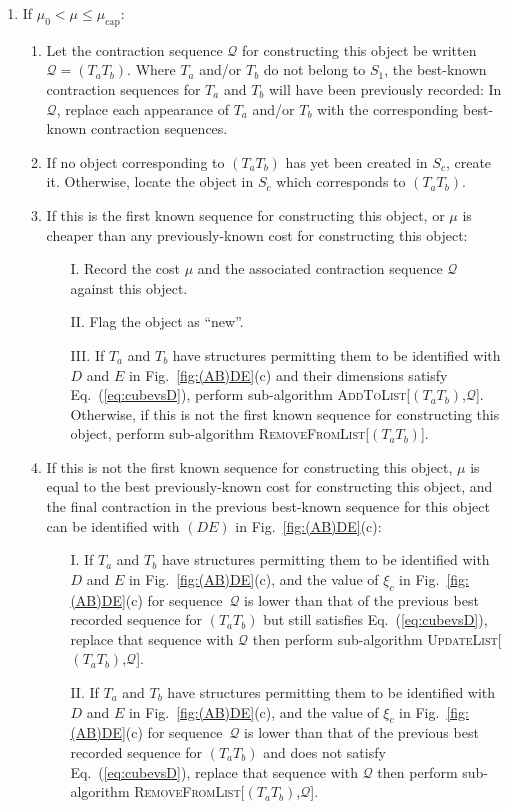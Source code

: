 \documentclass[aps,pre,reprint,superscriptaddress,amsfonts,amsmath,showpacs,nofootinbib,floatfix]{revtex4-1}
\newcommand{\mrm}[1]{\mathrm{#1}}
\newcommand{\mc}[1]{\mathcal{#1}}
\newcommand{\Eref}[1]{Eq.~(\ref{#1})}
\newcommand{\fref}[1]{Fig.~\ref{#1}}
\newcommand{\xc}{\xi_c}
\newcommand{\fuse}[2]{(#1#2)} %
\begin{document}
\begin{enumerate}
\begin{enumerate}
\begin{enumerate}
\item If $\mu_0<\mu\leq\mu_\mrm{cap}$: 
\begin{enumerate}
\item Let the contraction sequence $\mc{Q}$ for constructing this object be written $\mc{Q}=\fuse{T_a}{T_b}$. Where $T_a$ and/or $T_b$ do not belong to $S_1$, the best-known contraction sequences for $T_a$ and $T_b$ will have been previously recorded: In $\mc{Q}$, replace each appearance of $T_a$ and/or $T_b$ with the corresponding best-known contraction sequences.
\item If no object corresponding to $\fuse{T_a}{T_b}$ has yet been created in $S_c$, create it. Otherwise, locate the object in $S_c$ which corresponds to $\fuse{T_a}{T_b}$.
\item If this is the first known sequence for constructing this object, or $\mu$ is cheaper than any previously-known cost for constructing this object:
\begin{itemize}
\item[I.] Record the cost $\mu$ and the associated contraction sequence $\mc{Q}$ against this object.
\item[II.] Flag the object as ``new''. 
\item[III.] If $T_a$ and $T_b$ have structures permitting them to be identified with $D$ and $E$ in \fref{fig:(AB)DE}(c) and their dimensions satisfy \Eref{eq:cubevsD}, perform sub-algorithm \textsc{AddToList[$\fuse{T_a}{T_b}$,$\mc{Q}$]}. Otherwise, if this is not the first known sequence for constructing this object, perform sub-algorithm \textsc{RemoveFromList[$\fuse{T_a}{T_b}$]}.
\end{itemize}
\item If this is not the first known sequence for constructing this object, $\mu$ is equal to the best previously-known cost for constructing this object, and the final contraction in the previous best-known sequence for this object can be identified with $(DE)$ in \fref{fig:(AB)DE}(c):
\begin{itemize}
\item[I.] If $T_a$ and $T_b$ have structures permitting them to be identified with $D$ and $E$ in \fref{fig:(AB)DE}(c), and the value of $\xc$ in \fref{fig:(AB)DE}(c) for sequence~$\mc{Q}$ is lower than that of the previous best recorded sequence for $(T_aT_b)$ but still satisfies \Eref{eq:cubevsD}, replace that sequence with $\mc{Q}$ then perform sub-algorithm \textsc{UpdateList[$\fuse{T_a}{T_b}$,$\mc{Q}$]}.
\item[II.] If $T_a$ and $T_b$ have structures permitting them to be identified with $D$ and $E$ in \fref{fig:(AB)DE}(c), and the value of $\xc$ in \fref{fig:(AB)DE}(c) for sequence~$\mc{Q}$ is lower than that of the previous best recorded sequence for $(T_aT_b)$ and does not satisfy \Eref{eq:cubevsD}, replace that sequence with $\mc{Q}$ then perform sub-algorithm \textsc{RemoveFromList[$\fuse{T_a}{T_b}$,$\mc{Q}$]}.

\end{itemize}
\end{enumerate}
\end{enumerate}
\end{enumerate}
\end{enumerate}
\end{document}
